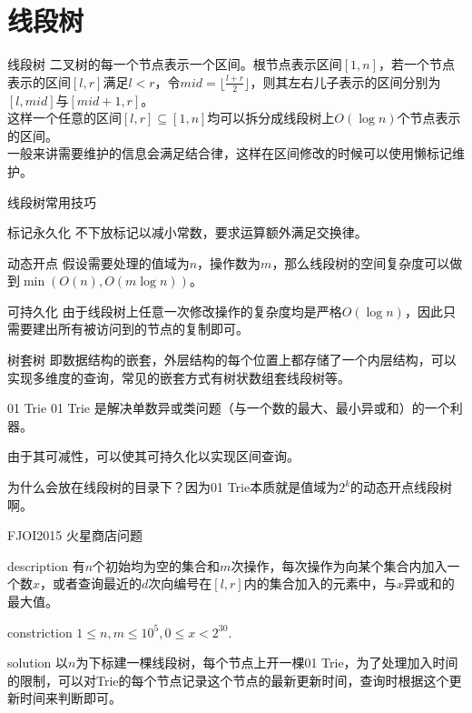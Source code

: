 \documentclass{beamer}
\begin{document}
	\section{线段树}
	\begin{frame}{线段树}
		二叉树的每一个节点表示一个区间。根节点表示区间$[1,n]$，若一个节点表示的区间$[l,r]$满足$l<r$，令$mid=\lfloor\frac{l+r}{2}\rfloor$，则其左右儿子表示的区间分别为$[l,mid]$与$[mid+1,r]$。\\
		
		这样一个任意的区间$[l,r]\subseteq[1,n]$均可以拆分成线段树上$O(\log n)$个节点表示的区间。\\
		
		一般来讲需要维护的信息会满足结合律，这样在区间修改的时候可以使用懒标记维护。
	\end{frame}
	\begin{frame}{线段树常用技巧}
		\begin{block}{标记永久化}
			不下放标记以减小常数，要求运算额外满足交换律。
		\end{block}
		\pause
		\begin{block}{动态开点}
			假设需要处理的值域为$n$，操作数为$m$，那么线段树的空间复杂度可以做到$\min(O(n),O(m\log n))$。
		\end{block}
		\pause
		\begin{block}{可持久化}
			由于线段树上任意一次修改操作的复杂度均是严格$O(\log n)$，因此只需要建出所有被访问到的节点的复制即可。
		\end{block}
		\pause
		\begin{block}{树套树}
			即数据结构的嵌套，外层结构的每个位置上都存储了一个内层结构，可以实现多维度的查询，常见的嵌套方式有树状数组套线段树等。
		\end{block}
	\end{frame}
	\begin{frame}{01 Trie}
		01 Trie 是解决单数异或类问题（与一个数的最大、最小异或和）的一个利器。
		
		由于其可减性，可以使其可持久化以实现区间查询。
		
		为什么会放在线段树的目录下？因为01 Trie本质就是值域为$2^k$的动态开点线段树啊。
	\end{frame}
	\begin{frame}{FJOI2015 火星商店问题}
		\begin{block}{description}
			有$n$个初始均为空的集合和$m$次操作，每次操作为向某个集合内加入一个数$x$，或者查询最近的$d$次向编号在$[l,r]$内的集合加入的元素中，与$x$异或和的最大值。
		\end{block}
		\begin{block}{constriction}
			$1 \le n, m \le 10^5, 0 \le x < 2^{30}.$
		\end{block}
		\pause
		\begin{block}{solution}
			以$n$为下标建一棵线段树，每个节点上开一棵01 Trie，为了处理加入时间的限制，可以对Trie的每个节点记录这个节点的最新更新时间，查询时根据这个更新时间来判断即可。
		\end{block}
	\end{frame}
\end{document}
